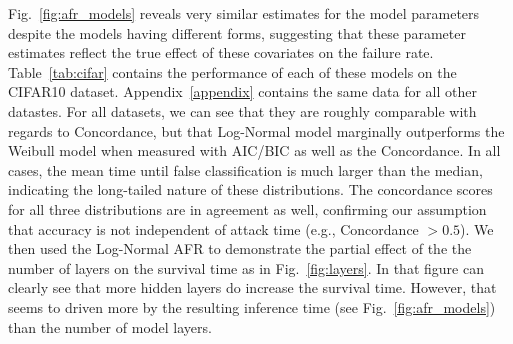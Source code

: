 Fig.~\ref{fig:afr_models} reveals very similar estimates for the model parameters despite the models having different forms, suggesting that these parameter estimates reflect the true effect of these covariates on the failure rate. Table~\ref{tab:cifar} contains the performance of each of these models on the CIFAR10 dataset.  Appendix~\ref{appendix} contains the same data for all other datastes. For all datasets, we can see that they are roughly comparable with regards to Concordance, but that Log-Normal model marginally outperforms the Weibull model when measured with AIC/BIC as well as the Concordance. 
In all cases, the mean time until false classification is much larger than the median, indicating the long-tailed nature of these distributions. 
The concordance scores for all three distributions are in agreement as well, confirming our assumption that accuracy is not independent of attack time (e.g., Concordance $> 0.5$).
We then used the Log-Normal AFR to demonstrate the partial effect of the the number of layers on the survival time as in Fig.~\ref{fig:layers}. In that figure can clearly see that more hidden layers do increase the survival time. However, that seems to driven more by the resulting inference time (see Fig.~\ref{fig:afr_models}) than the number of model layers.
